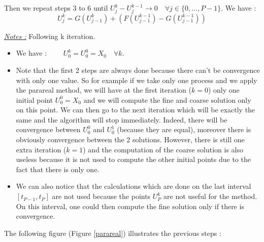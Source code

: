 \noindent Then we repeat steps 3 to 6 until $U_j^k-U_j^{k-1}\rightarrow 0 \quad \forall j\in\{0,\dots,P-1\}$. We have :
$$U_j^k=G(U_{j-1}^k)+(F(U_{j-1}^{k-1})-G(U_{j-1}^{k-1}))$$

\noindent \underline{\textit{Notes :}} Following k iteration.
\begin{itemize}[label=-]
	\item We have : $\qquad U_0^k=U_0^0=X_0 \quad \forall k$.
	\item Note that the first 2 steps are always done because there can't be convergence with only one value. So for example if we take only one process and we apply the parareal method, we will have at the first iteration ($k=0$) only one initial point $U_0^0=X_0$ and we will compute the fine and coarse solution only on this point. We can then go to the next iteration which will be exactly the same and the algorithm will stop immediately. Indeed, there will be convergence between $U_0^0$ and $U_0^1$ (because they are equal), moreover there is obviously convergence between the 2 solutions. However, there is still one extra iteration ($k=1$) and the computation of the coarse solution is also useless because it is not used to compute the other initial points due to the fact that there is only one.
	\item We can also notice that the calculations which are done on the last interval $[t_{P-1},t_P]$ are not used because the points $U_P^k$ are not useful for the method. On this interval, one could then compute the fine solution only if there is convergence.
\end{itemize}

\newpage

\noindent The following figure (Figure \ref{parareal}) illustrates the previous steps :

